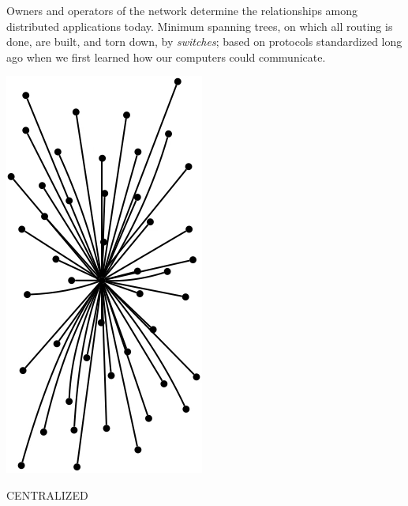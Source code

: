%

%

\begin{highlightbox} 
\noindent Owners and operators of the network determine the relationships among distributed applications today. %
Minimum spanning trees, on which all routing is done, are built, and torn down, by \emph{switches}; based on protocols standardized long ago when we first learned how our computers could communicate. %
\end{highlightbox}


\begin{marginfigure}
  \includegraphics[width=0.6\linewidth]{../../FIGURES/Baran-Centralized.png}
  \caption{CENTRALIZED}
  \vspace{12pt}
\end{marginfigure}

